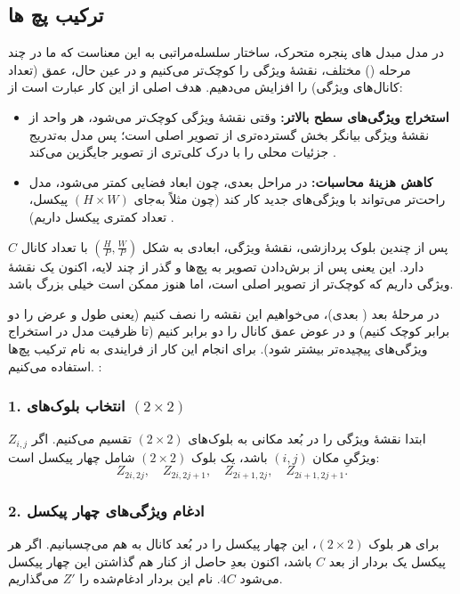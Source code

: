 \subsection{ترکیب پچ ها}
در مدل مبدل های پنجره متحرک، ساختار سلسله‌مراتبی به این معناست که ما در چند مرحله () مختلف، نقشهٔ ویژگی را کوچک‌تر می‌کنیم و در عین حال، عمق (تعداد کانال‌های ویژگی) را افزایش می‌دهیم. هدف اصلی از این کار عبارت است از:

\begin{itemize}
	\item \textbf{استخراج ویژگی‌های سطح بالاتر:}
	وقتی نقشهٔ ویژگی کوچک‌تر می‌شود، هر واحد از نقشهٔ ویژگی بیانگر بخش گسترده‌تری از تصویر اصلی است؛ 
	پس مدل به‌تدریج جزئیات محلی را با درک کلی‌تری از تصویر جایگزین می‌کند \cite{he2016deep}.
	
	\item \textbf{کاهش هزینهٔ محاسبات:}
	در مراحل بعدی، چون ابعاد فضایی کمتر می‌شود، مدل راحت‌تر می‌تواند با ویژگی‌های جدید کار کند 
	(چون مثلاً به‌جای \((H \times W)\) پیکسل، تعداد کمتری پیکسل داریم) \cite{liu2021swintransformer}.
\end{itemize}


پس از چندین بلوک پردازشی، نقشهٔ ویژگی، ابعادی به شکل \((\tfrac{H}{P}, \tfrac{W}{P})\) با تعداد کانال \(\displaystyle C\) دارد. 
این یعنی پس از برش‌دادن تصویر به پچ‌ها و گذر از چند لایه، اکنون یک نقشهٔ ویژگی داریم که کوچک‌تر از تصویر اصلی است، 
اما هنوز ممکن است خیلی بزرگ باشد.

در مرحلهٔ بعد ( بعدی)، می‌خواهیم این نقشه را نصف کنیم 
(یعنی طول و عرض را دو برابر کوچک کنیم) و در عوض عمق کانال را دو برابر کنیم 
(تا ظرفیت مدل در استخراج ویژگی‌های پیچیده‌تر بیشتر شود). برای انجام این کار از فرایندی به نام 
ترکیب پچ‌ها استفاده می‌کنیم.
\cite{liu2021swintransformer}:

\subsubsection{1. انتخاب بلوک‌های \((2 \times 2)\)}
ابتدا نقشهٔ ویژگی را در بُعد مکانی به بلوک‌های \((2 \times 2)\) تقسیم می‌کنیم.  
اگر \(\displaystyle Z_{i,j}\) ویژگیِ مکان \((i, j)\) باشد، 
یک بلوک \((2 \times 2)\) شامل چهار پیکسل است:
\[
Z_{2i, 2j}, \quad Z_{2i, 2j+1}, \quad Z_{2i+1, 2j}, \quad Z_{2i+1, 2j+1}.
\]

\subsubsection{2. ادغام ویژگی‌های چهار پیکسل}
برای هر بلوک \((2 \times 2)\)، این چهار پیکسل را در بُعد کانال به هم می‌چسبانیم.  
اگر هر پیکسل یک بردار از بعد \(\displaystyle C\) باشد، اکنون بعدِ حاصل از کنار هم گذاشتن این چهار پیکسل می‌شود \(\displaystyle 4C\).  
نام این بردار ادغام‌شده را \(\displaystyle Z'\) می‌گذاریم.

